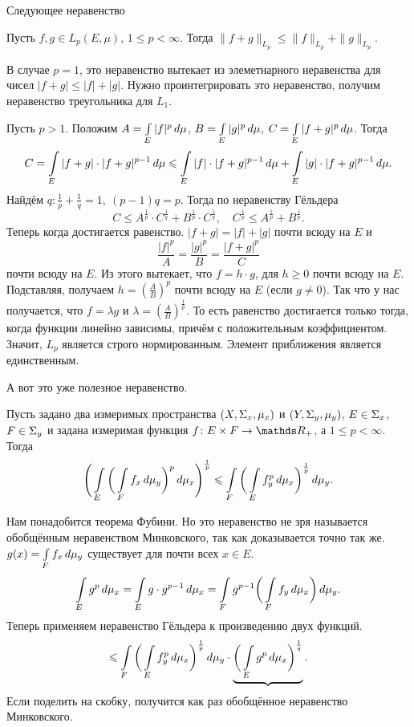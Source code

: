 Следующее неравенство
\begin{Ut}
  Пусть $f,g\in L_p(E,\mu)$, $1\le p<\infty$. Тогда $\|f+g\|_{L_p}\le \|f\|_{L_p}+\|g\|_{L_p}$.
\end{Ut}
\begin{Proof}
  В случае $p=1$, это неравенство вытекает из элеметнарного неравенства для чисел $|f+g|\le |f|+|g|$. Нужно проинтегрировать это неравенство, получим неравенство треугольника для $L_1$.

Пусть $p>1$. Положим $A = \int\limits_{E}|f|^p\,d\mu$, $B = \int\limits_{E}|g|^p\,d\mu$, $C = \int\limits_{E}|f+g|^p\,d\mu$. Тогда 
\[
  C = \int\limits_{E}|f+g|\cdot |f+g|^{p-1}\,d\mu\leqslant \int\limits_{E}|f|\cdot |f+g|^{p-1}\,d\mu+\int\limits_{E}|g|\cdot |f+g|^{p-1}\,d\mu.
\]
Найдём $q\colon \frac1p+\frac1q =1,\ (p-1)q = p$. Тогда по неравенству Гёльдера
\[
  C\le A^{\frac1p}\cdot C^{\frac1q} + B^{\frac1p}\cdot C^{\frac 1q}, \quad C^{\frac1p}\le A^{\frac1p} + B^{\frac1p}.
\]
Теперь когда достигается равенство. $|f+g| = |f|+|g|$ почти всюду на $E$ и 
\[
  \frac{|f|^p}A = \frac{|g|^p}B = \frac{|f+g|^p}C
\]
почти всюду на $E$. Из этого вытекает, что $f = h\cdot g $, для $h\ge 0$ почти всюду на $E$. Подставляя, получаем $h = \left(\frac AB\right)^p$ почти всюду на $E$ (если $g\ne 0$). Так что у нас получается, что $f=\lambda g$ и  $\lambda = \left(\frac AB\right)^{\frac1p}$. То есть равенство достигается только тогда, когда функции линейно зависимы, причём с положительным коэффициентом. Значит, $L_p$ является строго нормированным. Элемент приближения является единственным.
\end{Proof}

А вот это уже полезное неравенство.
\begin{Ut}
  Пусть задано два измеримых пространства $(X,\Sigma_x,\mu_x)$ и $(Y,\Sigma_y,\mu_y)$, $E\in\Sigma_x$, $F\in \Sigma_y$ и задана измеримая функция $f\colon E\times F\to \R_+$, а $1\le p<\infty$. Тогда
\[
  \Bigg(\int\limits_{E}\bigg(\int\limits_{F}f_x\,d\mu_y\bigg)^p\,d\mu_x\Bigg)^{\frac1p}\leqslant \int\limits_{F}\bigg(\int\limits_{E}f_y^p\,d\mu_x\bigg)^{\frac1p}\,d\mu_y.
\]
\end{Ut}
\begin{Proof}
  Нам понадобится теорема Фубини. Но это неравенство не зря называется обобщённым неравенством Минковского, так как доказывается точно так же. $g(x) = \int\limits_{F}f_x\,d\mu_y$ существует для почти всех $x\in E$.
\[
  \int\limits_{E}g^p\,d\mu_x = \int\limits_{E}g\cdot g^{p-1}\,d\mu_x = \int\limits_{F}g^{p-1}\bigg(\int\limits_{F}f_y\,d\mu_x\bigg)\,d\mu_y.
\]
Теперь применяем неравенство Гёльдера к произведению двух функций.
\[
 \leqslant \int\limits_{F}\bigg(\int\limits_{E} f_y^p\,d\mu_x\bigg)^{\frac1p}\,d\mu_y\cdot \underbrace{\bigg(\int\limits_{E}g^p\,d\mu_x\bigg)^{\frac1q}}.
\]
Если поделить на скобку, получится как раз обобщённое неравенство Минковского.
\end{Proof}

